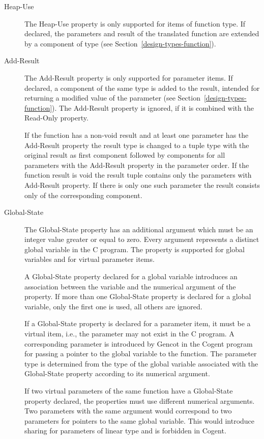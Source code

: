 \begin{description}
\item[Heap-Use]

The Heap-Use property is only supported for items of function type. If declared, the parameters and
result of the translated function are extended by a component of type  (see Section~\ref{design-types-function}).

\item[Add-Result]

The Add-Result property is only supported for parameter items. If declared, a component of the same type
is added to the result, intended for returning a modified value of the parameter (see Section~\ref{design-types-function}). 
The Add-Result property is ignored, if it is combined with the Read-Only property.

If the function has a non-void result and at least one parameter has the Add-Result property the result type is changed
to a tuple type with the original result as first component followed by components for all parameters with the Add-Result
property in the parameter order. If the function result is void the result tuple contains only the parameters with 
Add-Result property. If there is only one such parameter the result consists only of the corresponding component.

\item[Global-State]

The Global-State property has an additional argument which must be an integer value greater or equal to zero.
Every argument represents a distinct global variable in the C program. The property is supported for global 
variables and for virtual parameter items. 

A Global-State property declared for a global variable introduces an association between the variable and the 
numerical argument of the property. If more than one Global-State property is declared for a global variable, only
the first one is used, all others are ignored.

If a Global-State property is declared for a parameter item, it must be a virtual item, i.e., the parameter may not 
exist in the C program. A corresponding parameter is introduced by Gencot in the Cogent program for passing a pointer
to the global variable to the function. The parameter type is determined from the type of the global variable 
associated with the Global-State property according to its numerical argument.

If two virtual parameters of the same function have a Global-State property declared, the properties must use different 
numerical arguments. Two parameters with the same argument would correspond to two parameters for pointers to the 
same global variable. This would introduce sharing for parameters of linear type and is forbidden in Cogent.


\end{description}
